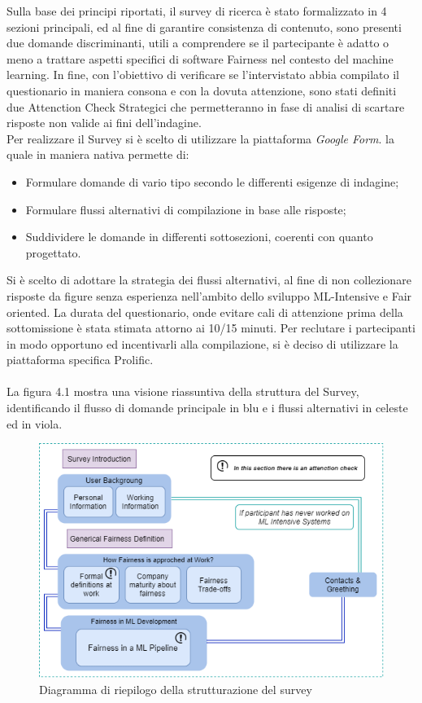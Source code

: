     Sulla base dei principi riportati, il survey di ricerca è stato formalizzato in 4 sezioni principali, ed al fine di garantire consistenza di contenuto, sono presenti due domande discriminanti, utili a comprendere se il partecipante è adatto o meno a trattare aspetti specifici di software Fairness nel contesto del machine learning. In fine, con l'obiettivo di verificare se l'intervistato abbia compilato il questionario in maniera consona e con la dovuta attenzione, sono stati definiti due Attenction Check Strategici che permetteranno in fase di analisi di scartare risposte non valide ai fini dell'indagine.\\ 
    
    Per realizzare il Survey si è scelto di utilizzare la piattaforma \emph{Google Form}. la quale in maniera nativa permette di:
    \
    \begin{itemize}
        \item Formulare domande di vario tipo secondo le differenti esigenze di indagine;
        \item Formulare flussi alternativi di compilazione in base alle risposte;
        \item Suddividere le domande in differenti sottosezioni, coerenti con quanto progettato.
    \end{itemize}
    
    Si è scelto di adottare la strategia dei flussi alternativi, al fine di non collezionare risposte da figure senza esperienza nell'ambito dello sviluppo ML-Intensive e Fair oriented. La durata del questionario, onde evitare cali di attenzione prima della sottomissione è stata stimata attorno ai 10/15 minuti. Per reclutare i partecipanti in modo opportuno ed incentivarli alla compilazione, si è deciso di utilizzare la piattaforma specifica Prolific.\\ \\
    
    La figura 4.1 mostra una visione riassuntiva della struttura del Survey, identificando il flusso di domande principale in blu e i flussi alternativi in celeste ed in viola. 
    \begin{figure}[h]
        \centering
        \includegraphics[width=1\textwidth]{figure/Survey Structural diagram.png}
        \caption{Diagramma di riepilogo della strutturazione del survey}
    \end{figure}
    

